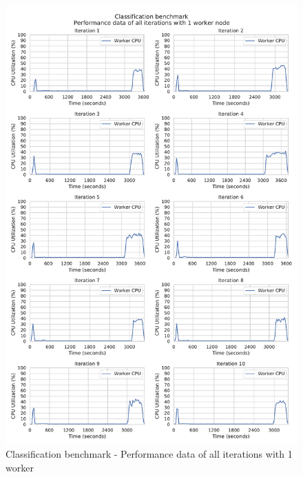\begin{figure}[h]
\centering
\includegraphics[scale=0.5]{images/appendix/evaluation_data/classification_benchmark/classification_1_worker_cpu_performance}
\caption{Classification benchmark - Performance data of all iterations with 1 worker}
\label{fig:appendix_eval_classification_static1}
\end{figure}

